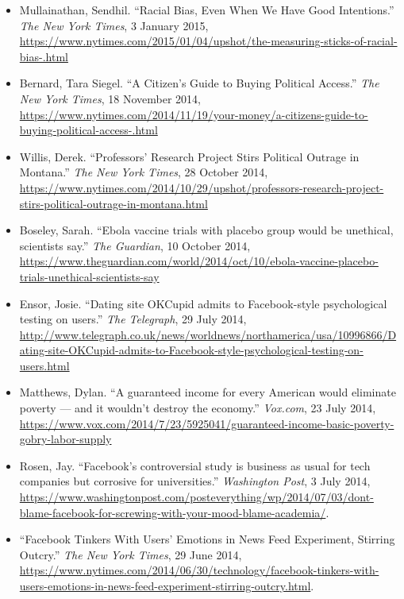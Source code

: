 \documentclass[12pt,a4paper]{article}
\begin{document}
\begin{itemize}
\item Mullainathan, Sendhil. ``Racial Bias, Even When We Have Good Intentions.'' \textit{The New York Times}, 3 January 2015, \url{https://www.nytimes.com/2015/01/04/upshot/the-measuring-sticks-of-racial-bias-.html}

\item Bernard, Tara Siegel. ``A Citizen's Guide to Buying Political Access.'' \textit{The New York Times}, 18 November 2014, \url{https://www.nytimes.com/2014/11/19/your-money/a-citizens-guide-to-buying-political-access-.html}

\item Willis, Derek. ``Professors' Research Project Stirs Political Outrage in Montana.'' \textit{The New York Times}, 28 October 2014, \url{https://www.nytimes.com/2014/10/29/upshot/professors-research-project-stirs-political-outrage-in-montana.html}

\item Boseley, Sarah. ``Ebola vaccine trials with placebo group would be unethical, scientists say.'' \textit{The Guardian}, 10 October 2014, \url{https://www.theguardian.com/world/2014/oct/10/ebola-vaccine-placebo-trials-unethical-scientists-say}

\item Ensor, Josie. ``Dating site OKCupid admits to Facebook-style psychological testing on users.'' \textit{The Telegraph}, 29 July 2014,  \url{http://www.telegraph.co.uk/news/worldnews/northamerica/usa/10996866/Dating-site-OKCupid-admits-to-Facebook-style-psychological-testing-on-users.html}

\item Matthews, Dylan. ``A guaranteed income for every American would eliminate poverty — and it wouldn't destroy the economy.'' \textit{Vox.com}, 23 July 2014, \url{https://www.vox.com/2014/7/23/5925041/guaranteed-income-basic-poverty-gobry-labor-supply}

\item Rosen, Jay. ``Facebook's controversial study is business as usual for tech companies but corrosive for universities.'' \textit{Washington Post}, 3 July 2014, \url{https://www.washingtonpost.com/posteverything/wp/2014/07/03/dont-blame-facebook-for-screwing-with-your-mood-blame-academia/}.

\item ``Facebook Tinkers With Users' Emotions in News Feed Experiment, Stirring Outcry.'' \textit{The New York Times}, 29 June 2014, \url{https://www.nytimes.com/2014/06/30/technology/facebook-tinkers-with-users-emotions-in-news-feed-experiment-stirring-outcry.html}.


\end{itemize}
\end{document}

